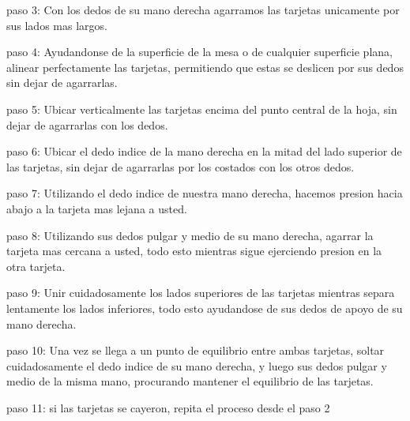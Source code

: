 \documentclass{article}
\begin{document}
paso 3: Con los dedos de su mano derecha agarramos las tarjetas unicamente por sus lados mas largos.

\vspace{0.5cm}
        
paso 4: Ayudandonse de la superficie de la mesa o de cualquier superficie plana, alinear perfectamente las tarjetas, permitiendo que estas se deslicen por sus dedos sin dejar de agarrarlas.

\vspace{0.5cm}

paso 5: Ubicar verticalmente las tarjetas encima del punto central de la hoja, sin dejar de agarrarlas con los dedos.

\vspace{0.5cm}

paso 6: Ubicar el dedo indice de la mano derecha en la mitad del lado superior de las tarjetas, sin dejar de agarrarlas por los costados con los otros dedos.

\vspace{0.5cm}

paso 7: Utilizando el dedo indice de nuestra mano derecha, hacemos presion hacia abajo a la tarjeta mas lejana a usted.

\vspace{0.5cm}

paso 8: Utilizando sus dedos pulgar y medio de su mano derecha, agarrar la tarjeta mas cercana a usted, todo esto mientras sigue ejerciendo presion en la otra tarjeta.

\vspace{0.5cm}

paso 9: Unir cuidadosamente los lados superiores de las tarjetas mientras separa lentamente los lados inferiores, todo esto ayudandose de sus dedos de apoyo de su mano derecha.

\vspace{0.5cm}

paso 10: Una vez se llega a un punto de equilibrio entre ambas tarjetas, soltar cuidadosamente el dedo indice de su mano derecha, y luego sus dedos pulgar y medio de la misma mano, procurando mantener el equilibrio de las tarjetas.

\vspace{0.5cm}

paso 11: si las tarjetas se cayeron, repita el proceso desde el paso 2
\end{document}
